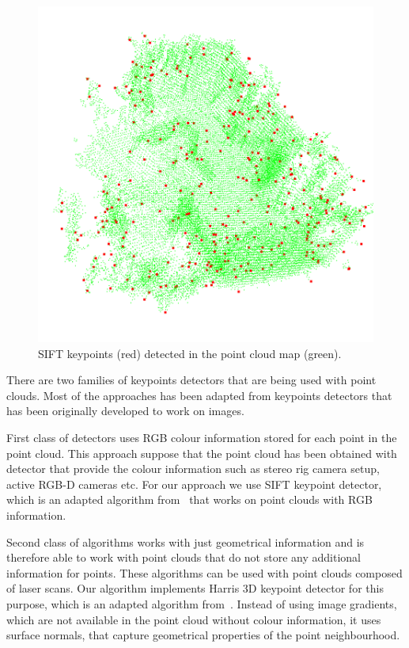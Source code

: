 \begin{figure}
    \centering
    \includegraphics[width=\textwidth]{../img/v1-keypoints.png}
    \caption[Detected keypoints]{\gls{SIFT} keypoints (red) detected in the point cloud map (green).}
    \label{fig:v1-keypoints}
\end{figure}

There are two families of keypoints detectors that are being used with point clouds. Most of the approaches has been adapted from keypoints detectors that has been originally developed to work on images.

First class of detectors uses \gls{RGB} colour information stored for each point in the point cloud. This approach suppose that the point cloud has been obtained with detector that provide the colour information such as stereo rig camera setup, active \gls{RGB-D} cameras etc. For our approach we use \gls{SIFT} keypoint detector, which is an adapted algorithm from~\citet{lowe2004distinctive} that works on point clouds with \gls{RGB} information.

Second class of algorithms works with just geometrical information and is therefore able to work with point clouds that do not store any additional information for points. These algorithms can be used with point clouds composed of laser scans. Our algorithm implements Harris \gls{3D} keypoint detector for this purpose, which is an adapted algorithm from~\citet{harris1988combined}. Instead of using image gradients, which are not available in the point cloud without colour information, it uses surface normals, that capture geometrical properties of the point neighbourhood.

